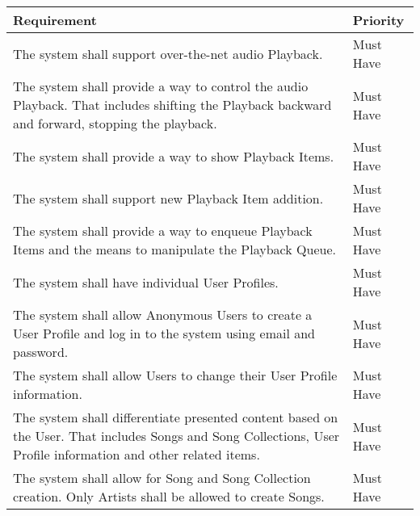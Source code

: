 \begin{table}[h!]
    \centering
    \begin{tabular}{|p{12cm}|p{3cm}|}
        \hline
        \textbf{Requirement}                                                                                                                                                  & \textbf{Priority} \\
        \hline
        The system shall support over-the-net audio Playback.                                                                                                                 & Must Have         \\
        \hline
        The system shall provide a way to control the audio Playback. That includes shifting the Playback backward and forward, stopping the playback. & Must Have \\
        \hline
        The system shall provide a way to show Playback Items.                                                                                                                & Must Have         \\
        \hline
        The system shall support new Playback Item addition.                                                                                                                  & Must Have         \\
        \hline
        The system shall provide a way to enqueue Playback Items and the means to manipulate the Playback Queue. & Must Have \\
        \hline
        The system shall have individual User Profiles.                                                                                                                       & Must Have         \\
        \hline
        The system shall allow Anonymous Users to create a User Profile and log in to the system using email and password. & Must Have \\
        \hline
        The system shall allow Users to change their User Profile information.                                                                                                & Must Have         \\
        \hline
        The system shall differentiate presented content based on the User. That includes Songs and Song Collections, User Profile information and other related items. & Must Have \\
        \hline
        The system shall allow for Song and Song Collection creation. Only Artists shall be allowed to create Songs. & Must Have\\

\end{tabular}
\end{table}
